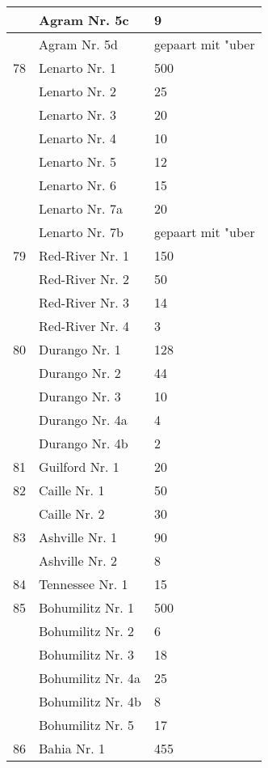 \documentclass[a4paper, 11pt, oneside, polutonikogreek, german]{article}
\begin{document}
\begin{center}
\begin{longtable}{|l|l|l|}
          & Agram Nr. 5c & 9 \\ \hline
          & Agram Nr. 5d & gepaart mit "uber \\ \hline
        78 & Lenarto Nr. 1 & 500 \\ \hline
          & Lenarto Nr. 2 & 25 \\ \hline
          & Lenarto Nr. 3 & 20 \\ \hline
          & Lenarto Nr. 4 & 10 \\ \hline
          & Lenarto Nr. 5 & 12 \\ \hline
          & Lenarto Nr. 6 & 15 \\ \hline
          & Lenarto Nr. 7a & 20 \\ \hline
          & Lenarto Nr. 7b & gepaart mit "uber \\ \hline
        79 & Red-River Nr. 1 & 150 \\ \hline
          & Red-River Nr. 2 & 50 \\ \hline
          & Red-River Nr. 3 & 14 \\ \hline
          & Red-River Nr. 4 & 3 \\ \hline
        80 & Durango Nr. 1 & 128 \\ \hline
          & Durango Nr. 2 & 44 \\ \hline
          & Durango Nr. 3 & 10 \\ \hline
          & Durango Nr. 4a & 4 \\ \hline
          & Durango Nr. 4b & 2 \\ \hline
        81 & Guilford Nr. 1 & 20 \\ \hline
        82 & Caille Nr. 1 & 50 \\ \hline
          & Caille Nr. 2 & 30 \\ \hline
        83 & Ashville Nr. 1 & 90 \\ \hline
          & Ashville Nr. 2 & 8 \\ \hline
        84 & Tennessee Nr. 1 & 15 \\ \hline
        85 & Bohumilitz Nr. 1 & 500 \\ \hline
          & Bohumilitz Nr. 2 & 6 \\ \hline
          & Bohumilitz Nr. 3 & 18 \\ \hline
          & Bohumilitz Nr. 4a & 25 \\ \hline
          & Bohumilitz Nr. 4b & 8 \\ \hline
          & Bohumilitz Nr. 5 & 17 \\ \hline
        86 & Bahia Nr. 1 & 455 \\ \hline

\end{longtable}
\end{center}
\end{document}
